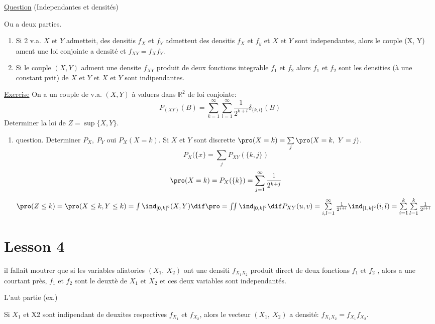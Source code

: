 \underline{Question} (Independantes et densités)
\begin{proposition}
	Ou a deux parties.
	\begin{enumerate}
		\item Si 2 v.a. $X$ et $Y$ admetteit, des densitis $f_X$ et $f_Y$ admetteut des densitis $f_X$ et $f_y$ et $X$ et $Y$ sont independantes, alors le couple (X, Y) ament une loi conjointe a densité et $f_{XY}=f_X f_Y$.
		\item Si le couple $(X, Y)$ adment une densite $f_{XY}$ produit de deux fouctions integrable $f_1$ et $f_2$ alors $f_1$ et $f_2$ sont les densities (à une constant pvit) de $X$ et $Y$ et $X$ et $Y$ sont indipendantes.
	\end{enumerate}
\end{proposition}

\underline{Exercise}
On a un couple de v.a. $(X, Y)$ à valuers dans $\mathbb{R}^2$ de loi conjointe:
$$P_{(XY)}(B)=\sum_{k=1}^\infty\sum_{l=1}^\infty \frac{1}{2^{k+l}}\delta_{\{k, l\}}(B)$$
Determiner la loi de $Z=\sup \{X, Y\}$.
\begin{enumerate}
	\item{question}. Determiner $P_X,\ P_Y$ oui $P_X(X=k)$.
Si $X$ et $Y$ sont discrette $\pro (X=k)=\sum\limits_j\pro (X=k,\ Y=j)$. $$P_X(\{x\}=\sum\limits_j P_{XY}(\{k, j\})$$
$$\pro (X=k)=P_X(\{k\})=\sum\limits_{j=1}^\infty \frac{1}{2^{k+j}}$$
$\pro (Z\leq k)=\pro (X\leq k, Y\leq k)=\int \ind _{[0, k]^2}(X, Y)\dif \pro =\iint \ind _{[0, k]^2} \dif P_{XY}(u, v)=\sum\limits_{i,l=1}^\infty \frac{1}{2^{i+l}}\ind _{[1, k]^2}(i, l)=\sum\limits_{i=1}^k\sum\limits_{l=1}^k\frac{1}{2^{i+l}}$
\end{enumerate}

\section{Lesson 4} %
\label{sec:lesson_4}

il fallait moutrer que si les variables aliatories $(X_1,\ X_2)$ ont une densiti $f_{X_1X_2}$ produit direct de deux fonctions $f_1$ et $f_2$ , alors a une courtant près, $f_1$ et $f_2$  sont le deuxtè de $X_1$ et $X_2$ et ces deux variables sont independantés.

L'aut partie (ex.)

Si $X_1$ et X2 sont indipendant de deuxites respectives $f_{X_1}$ et $f_{X_2}$, alors le vecteur $(X_1,\ X_2)$ a densité: $f_{X_1X_2}=f_{X_1} f_{X_2}$.

